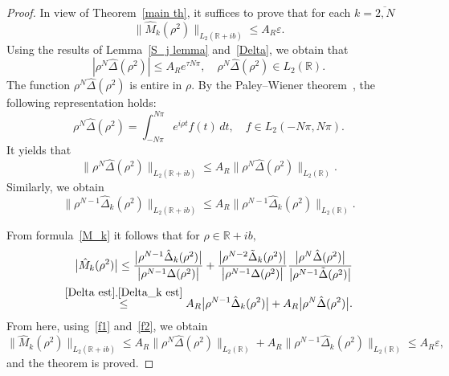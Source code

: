 \documentclass[a4paper, 12pt] {article}
\theoremstyle{plain}
\theoremstyle{remark}
\theoremstyle{plain}
\theoremstyle{definition}
\numberwithin{equation}{section}
\begin{document}
\begin{proof}
In view of Theorem~\ref{main th}, it suffices to prove that for each $k=\overline{2, N}$
\begin{equation*}
\big\| \hat M_k(\rho^2) \big\|_{L_2({\mathbb R}+ib)} \le A_R \varepsilon.
\end{equation*}
Using the results of Lemma~\ref{S_j lemma} and~\eqref{Delta}, we obtain that
$$|\rho^{N}\hat \Delta(\rho^2)| \le A_R e^{\tau N \pi}, \quad  \rho^{N}\hat \Delta(\rho^2) \in L_2(\mathbb R).$$
The function $\rho^{N}\hat \Delta(\rho^2)$ is entire in $\rho.$
By the Paley--Wiener theorem~\cite[\S19.3]{rudin}, the following representation holds:
$$\rho^{N}\hat \Delta(\rho^2) = \int_{-N\pi}^{N\pi} e^{i \rho t} f(t) \, dt, \quad
f\in L_2(-N\pi, N\pi).$$
It yields that
\begin{equation} \big\|\rho^{N}\hat \Delta(\rho^2)\big\|_{L_2({\mathbb R}+ib)} \le A_R \big\|\rho^{N}\hat \Delta(\rho^2) \big\|_{L_2({\mathbb R})}.
\label{f1}
\end{equation}
Similarly, we obtain 
\begin{equation} \label{f2}
\big\|\rho^{N-1}\hat \Delta_k(\rho^2)\big\|_{L_2({\mathbb R}+ib)} \le A_R \|\rho^{N-1}\hat \Delta_k(\rho^2) \|_{L_2({\mathbb R})}.
\end{equation}

From formula~\eqref{M_k} it follows that for $\rho \in {\mathbb R}+ib,$
\begin{equation*}
\begin{split}
\big|\hat M_k(\rho^2)\big| \le \frac{\big| \rho^{N-1} \hat \Delta_k(\rho^2)\big|}{\big|\rho^{N-1}\Delta(\rho^2)\big|}
+ \frac{\big|\rho^{N-2} \tilde \Delta_k(\rho^2)\big|}{\big|\rho^{N-1}\Delta(\rho^2)\big|}
\frac{ \big| \rho^{N} \hat \Delta(\rho^2)\big|}{\big|\rho^{N-1}\tilde\Delta(\rho^2)\big|}
 \\
 \overset{\eqref{Delta est}, \eqref{Delta_k est}}{\le}  A_R \big| \rho^{N-1} \hat \Delta_k(\rho^2)\big| + A_R  \big| \rho^{N} \hat \Delta(\rho^2)\big|.
\end{split}
\end{equation*}
From here, using~\eqref{f1} and~\eqref{f2}, we obtain
$$\big\|\hat M_k(\rho^2)\big\|_{L_2({\mathbb R}+ib)} \le A_R \big\|\rho^{N}\hat \Delta(\rho^2) \big\|_{L_2({\mathbb R})}+
A_R \|\rho^{N-1}\hat \Delta_k(\rho^2) \|_{L_2({\mathbb R})} \le A_R \varepsilon,$$
and the theorem is proved.
\end{proof}

\vspace*{5mm}
\end{document}

